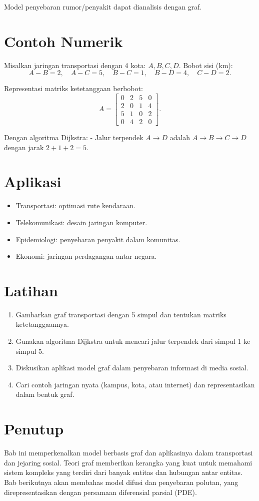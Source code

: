 \documentclass{bukumjh}
\begin{document}
Model penyebaran rumor/penyakit dapat dianalisis dengan graf.

\section{Contoh Numerik}
Misalkan jaringan transportasi dengan 4 kota: $A,B,C,D$.  
Bobot sisi (km):
\[
A-B=2, \quad A-C=5, \quad B-C=1, \quad B-D=4, \quad C-D=2.
\]

Representasi matriks ketetanggaan berbobot:
\[
A = \begin{bmatrix}
0 & 2 & 5 & 0 \\
2 & 0 & 1 & 4 \\
5 & 1 & 0 & 2 \\
0 & 4 & 2 & 0
\end{bmatrix}.
\]

Dengan algoritma Dijkstra:
- Jalur terpendek $A \to D$ adalah $A \to B \to C \to D$ dengan jarak $2+1+2=5$.

\section{Aplikasi}
\begin{itemize}
    \item Transportasi: optimasi rute kendaraan.
    \item Telekomunikasi: desain jaringan komputer.
    \item Epidemiologi: penyebaran penyakit dalam komunitas.
    \item Ekonomi: jaringan perdagangan antar negara.
\end{itemize}

\section{Latihan}
\begin{enumerate}
    \item Gambarkan graf transportasi dengan 5 simpul dan tentukan matriks ketetanggaannya.
    \item Gunakan algoritma Dijkstra untuk mencari jalur terpendek dari simpul 1 ke simpul 5.
    \item Diskusikan aplikasi model graf dalam penyebaran informasi di media sosial.
    \item Cari contoh jaringan nyata (kampus, kota, atau internet) dan representasikan dalam bentuk graf.
\end{enumerate}

\section{Penutup}
Bab ini memperkenalkan model berbasis graf dan aplikasinya dalam transportasi dan jejaring sosial. Teori graf memberikan kerangka yang kuat untuk memahami sistem kompleks yang terdiri dari banyak entitas dan hubungan antar entitas. Bab berikutnya akan membahas {\jsg model difusi dan penyebaran polutan}, yang direpresentasikan dengan persamaan diferensial parsial (PDE).
\end{document}

